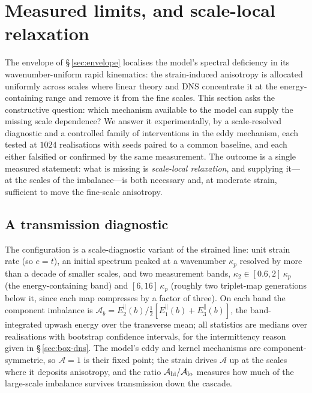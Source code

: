 \documentclass[lineno]{JFM-FLM_Au}
\begin{document}
\section{Measured limits, and scale-local relaxation}\label{sec:limits}

The envelope of \S\,\ref{sec:envelope} localises the model's spectral
deficiency in its wavenumber-uniform rapid kinematics: the strain-induced
anisotropy is allocated uniformly across scales where linear theory and
DNS concentrate it at the energy-containing range and remove it from the
fine scales. This section asks the constructive question: which mechanism
available to the model can supply the missing scale dependence? We answer
it experimentally, by a scale-resolved diagnostic and a controlled family
of interventions in the eddy mechanism, each tested at $1024$
realisations with seeds paired to a common baseline, and each either
falsified or confirmed by the same measurement. The outcome is a single
measured statement: what is missing is \emph{scale-local relaxation}, and
supplying it---at the scales of the imbalance---is both necessary and, at
moderate strain, sufficient to move the fine-scale anisotropy.

\subsection{A transmission diagnostic}\label{sec:transmission}

The configuration is a scale-diagnostic variant of the strained line: unit
strain rate (so $e=t$), an initial spectrum peaked at a wavenumber
$\kappa_p$ resolved by more than a decade of smaller scales, and two
measurement bands, $\kappa_2\in[0.6,2]\,\kappa_p$ (the energy-containing
band) and $[6,16]\,\kappa_p$ (roughly two triplet-map generations below
it, since each map compresses by a factor of three). On each band the
component imbalance is
$\mathcal A_b = E^{\|}_2(b)/\tfrac12[E^{\|}_1(b)+E^{\|}_3(b)]$, the
band-integrated upwash energy over the transverse mean; all statistics are
medians over realisations with bootstrap confidence intervals, for the
intermittency reason given in \S\,\ref{sec:box-dns}. The model's eddy and
kernel mechanisms are component-symmetric, so $\mathcal A=1$ is their
fixed point; the strain drives $\mathcal A$ up at the scales where it
deposits anisotropy, and the ratio
$\mathcal A_{\rm hi}/\mathcal A_{\rm lo}$ measures how much of the
large-scale imbalance survives transmission down the cascade.
\end{document}
